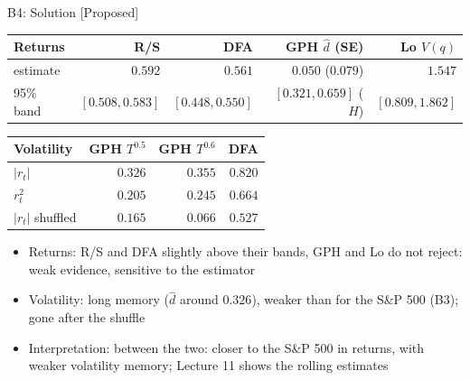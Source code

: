 \ifsolutions
\begin{frame}{B4: Solution [Proposed]}
\itemsize{\scriptsize}
\begin{center}
\scriptsize
\begin{tabular}{lrrrr}
\toprule
Returns & R/S & DFA & GPH $\hat d$ (SE) & Lo $V(q)$ \\
\midrule
estimate & $0.592$ & $0.561$ & $0.050$ ($0.079$) & $1.547$ \\
95\% band & $[0.508, 0.583]$ & $[0.448, 0.550]$ & $[0.321, 0.659]$ ($\hat H$) & $[0.809, 1.862]$ \\
\bottomrule
\end{tabular}
\end{center}
\begin{center}
\scriptsize
\begin{tabular}{lrrr}
\toprule
Volatility & GPH $T^{0.5}$ & GPH $T^{0.6}$ & DFA \\
\midrule
$|r_t|$ & $0.326$ & $0.355$ & $0.820$ \\
$r_t^2$ & $0.205$ & $0.245$ & $0.664$ \\
$|r_t|$ shuffled & $0.165$ & $0.066$ & $0.527$ \\
\bottomrule
\end{tabular}
\end{center}
\begin{itemize}
    \item Returns: R/S and DFA slightly above their bands, GPH and Lo do not reject: weak evidence, sensitive to the estimator
    \item Volatility: long memory ($\hat d$ around $0.326$), weaker than for the S\&P 500 (B3); gone after the shuffle
    \item Interpretation: between the two: closer to the S\&P 500 in returns, with weaker volatility memory; Lecture 11 shows the rolling estimates
\end{itemize}
\end{frame}
\fi


